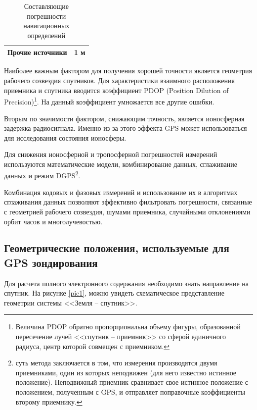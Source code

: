 \documentclass[a4paper]{article}
\begin{document}
\begin{table}[h]
\begin{center}
\begin{tabular}{|l|l|}
Прочие источники                                                                                                                         & 1 м                                                  \\ \hline
\end{tabular}
\end{center}
\caption{Составляющие погрешности навигационных определений}
\label{tableErrors}
\end{table}

Наиболее важным фактором для получения хорошей точности является геометрия рабочего созвездия спутников. Для характеристики взаимного расположения приемника и спутника вводится коэффициент PDOP (Position Dilution of Precision)\footnote{Величина PDOP обратно пропорциональна объему фигуры, образованной пересечение лучей <<спутник -- приемник>> со сферой единичного радиуса, центр которой совмещен с приемником.}. На данный коэффициент умножается все другие ошибки. 

Вторым по значимости фактором, снижающим точность, является ионосферная задержка радиосигнала. Именно из-за этого эффекта GPS может использоваться для исследования состояния ионосферы.

Для снижения ионосферной и тропосферной погрешностей измерений используются математические модели, комбинирование данных, сглаживание данных и режим DGPS\footnote{суть метода заключается в том, что измерения производятся двумя приемниками, один из которых неподвижен (для него известно истинное положение). Неподвижный приемник сравнивает свое истинное положение с положением, полученным с GPS, и отправляет поправочные коэффициенты второму приемнику.}.

Комбинация кодовых и фазовых измерений и использование их в алгоритмах сглаживания данных позволяют эффективно фильтровать погрешности, связанные с геометрией рабочего созвездия, шумами приемника, случайными отклонениями орбит часов и многолучевостью. 


\newpage
\subsection{Геометрические положения, используемые для GPS зондирования}
Для расчета полного электронного содержания необходимо знать направление на спутник. На рисунке \ref{pic1}, можно увидеть схематическое представление геометрии системы <<Земля -- спутник>>.
\end{document}
